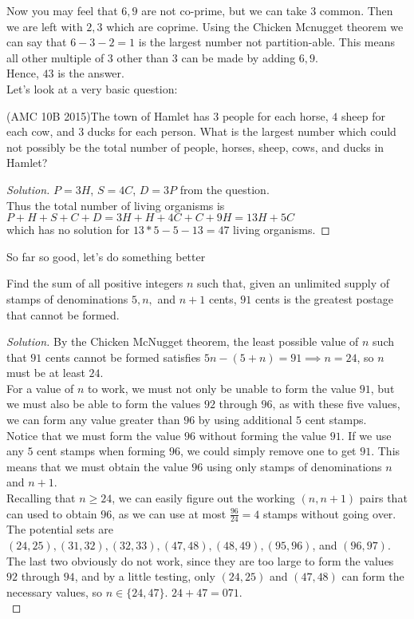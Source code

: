 Now you may feel that $6,9$ are not co-prime, but we can take $3$ common. Then we are left with $2,3$ which are coprime. Using the Chicken Mcnugget theorem we can say that $6-3-2=1$ is the largest number not partition-able. This means all other multiple of $3$ other than $3$ can be made by adding $6,9$.\\
Hence, $43$ is the answer.\\
Let's look at a very basic question:\\
\begin{example}
    (AMC 10B 2015)The town of Hamlet has $3$ people for each horse, $4$ sheep for each cow, and $3$ ducks for each person. What is the largest number which could not possibly be the total number of people, horses, sheep, cows, and ducks in Hamlet?
\end{example}
\begin{proof}
    [Solution]
    $P=3H$, $S=4C$, $D=3P$ from the question.\\
    Thus the total number of living organisms is $P+H+S+C+D=3H+H+4C+C+9H=13H+5C$\\
    which has no solution for $13*5-5-13=47$ living organisms.
\end{proof}
So far so good, let's do something better\\
\begin{example}
    [AIME II 2019] Find the sum of all positive integers $n$ such that, given an unlimited supply of stamps of denominations $5,n,$ and $n+1$ cents, $91$ cents is the greatest postage that cannot be formed.
\end{example}
\begin{proof}
[Solution]
By the Chicken McNugget theorem, the least possible value of $n$ such that $91$ cents cannot be formed satisfies $5n - (5 + n) = 91 \implies n = 24$, so $n$ must be at least $24$.\\
For a value of $n$ to work, we must not only be unable to form the value $91$, but we must also be able to form the values $92$ through $96$, as with these five values, we can form any value greater than $96$ by using additional $5$ cent stamps.\\
Notice that we must form the value $96$ without forming the value $91$. If we use any $5$ cent stamps when forming $96$, we could simply remove one to get $91$. This means that we must obtain the value $96$ using only stamps of denominations $n$ and $n+1$.\\
Recalling that $n \geq 24$, we can easily figure out the working $(n,n+1)$ pairs that can used to obtain $96$, as we can use at most $\frac{96}{24}=4$ stamps without going over. The potential sets are $(24, 25), (31, 32), (32, 33), (47, 48), (48, 49), (95, 96)$, and $(96, 97)$.\\
The last two obviously do not work, since they are too large to form the values $92$ through $94$, and by a little testing, only $(24, 25)$ and $(47, 48)$ can form the necessary values, so $n \in \{24, 47\}$. $24 + 47 = 071$.\\
\end{proof}
